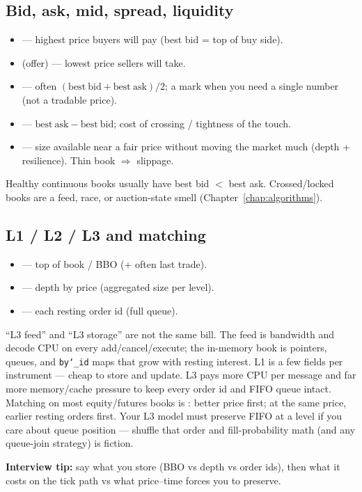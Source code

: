 \subsection{Bid, ask, mid, spread, liquidity}
\label{subsec:bbo-spread-liquidity}
\begin{itemize}
    \item {} --- highest price buyers will pay (best bid = top of buy side).
    \item {} (offer) --- lowest price sellers will take.
    \item {} --- often $(\mathrm{best\ bid} + \mathrm{best\ ask})/2$; 
          a mark when you need a single number (not a tradable price).
    \item {} --- $\mathrm{best\ ask} - \mathrm{best\ bid}$; 
          cost of crossing / tightness of the touch.
    \item {} --- size available near a fair price without moving 
          the market much (depth + resilience). Thin book $\Rightarrow$ slippage.
\end{itemize}
Healthy continuous books usually have best bid $<$ best ask. Crossed/locked books 
are a feed, race, or auction-state smell (Chapter~\ref{chap:algorithms}).

\subsection{L1 / L2 / L3 and matching}
\label{subsec:l1-l2-l3-matching}
\begin{itemize}
    \item {} --- top of book / BBO (+ often last trade).
    \item {} --- depth by price (aggregated size per level).
    \item {} --- each resting order id (full queue).
\end{itemize}
``L3 feed'' and ``L3 storage'' are not the same bill. The feed is bandwidth and decode 
CPU on every add/cancel/execute; the in-memory book is pointers, queues, and 
\texttt{by\char`_id} maps that grow with resting interest. L1 is a few fields per 
instrument --- cheap to store and update. L3 pays more CPU per message and far more 
memory/cache pressure to keep every order id and FIFO queue intact.
\newline
Matching on most equity/futures books is : better 
price first; at the same price, earlier resting orders first. Your L3 model must 
preserve FIFO at a level if you care about queue position --- shuffle that order and 
fill-probability math (and any queue-join strategy) is fiction.
\par\noindent\textbf{Interview tip:} say what you store (BBO vs depth vs order ids), then 
what it costs on the tick path vs what price--time forces you to preserve.


